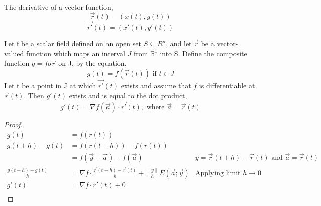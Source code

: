 \documentclass[twoside]{report}
\begin{document}
The derivative of a vector function,
\[
   \vec{r} (t) - (x(t),y(t))
\]
\[
   \vec{r'}(t) = (x'(t),y'(t))
\]
\begin{theorem}
   Let f be a scalar field defined on an open set $S 
   \subseteq R^n$, and let $\vec{r}$ be a vector-valued function which maps an interval $J$ from $\mathbb{R}^1$ into S. Define the composite function $g = f o \vec{r}$ on J, by the equation.
\[
   g(t) = f(\vec{r}(t)) \text{ if } t \in J
\]	
Let t be a point in J at which $\vec{r'}(t)$ exists and assume that $f$ is differentiable at $\vec{r}(t)$. Then $g'(t)$ exists and is equal to the dot product,
\[
   g'(t) = \nabla f(\vec{a}) \cdot \vec{r'}(t), \text{ where } \vec{a} = \vec{r}(t)
\]
\end{theorem}
\begin{proof}
\begin{align*}
g(t) &= f(r(t)) \\
g(t+h) - g(t) &= f(r(t+h)) - f(r(t)) \\
	      &= f(\vec{y} + \vec{a}) - f(\vec{a}) &\text{$y = \vec{r}(t+h)- \vec{r}(t)$ and $\vec{a} = \vec{r}(t)$} \\
\frac{g(t+h) - g(t)}{h} &= \nabla f \cdot \frac{\vec{r}(t+h) - \vec{r}(t)}{h} + \frac{\|y\|}{h} E(\vec{a};\vec{y}) &\text{Applying limit $h \rightarrow 0$}\\
g'(t) &= \nabla f \cdot r'(t)  + 0 \\
\end{align*}
\end{proof}
\end{document}
